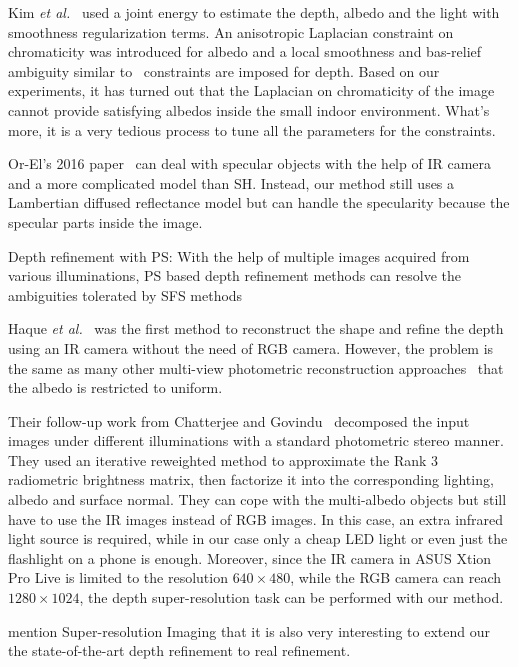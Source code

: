 Kim \emph{et al.}~\cite{kim2015joint} used a joint energy to estimate the depth, albedo and the light with smoothness regularization terms.
An anisotropic Laplacian constraint on chromaticity was introduced for albedo and a local smoothness and bas-relief ambiguity similar to~\cite{barron2013intrinsic} constraints are imposed for depth.
Based on our experiments, it has turned out that the Laplacian on chromaticity of the image cannot provide satisfying albedos inside the small indoor environment.
What's more, it is a very tedious process to tune all the parameters for the constraints.

Or-El's 2016 paper~\cite{or2016real} can deal with specular objects with the help of IR camera and a more complicated model than SH. 
Instead, our method still uses a Lambertian diffused reflectance model but can handle the specularity because the specular parts inside the image.


Depth refinement with PS: With the help of multiple images acquired from various illuminations, PS based depth refinement methods can resolve the ambiguities tolerated by SFS methods 

Haque \emph{et al.}~\cite{haque2014high} was the first method to reconstruct the shape and refine the depth using an IR camera without the need of RGB camera.
However, the problem is the same as many other multi-view photometric reconstruction approaches~\cite{park2013multiview, queau2017dense} that the albedo is restricted to uniform.

Their follow-up work from Chatterjee and Govindu~\cite{chatterjee2015photometric} decomposed the input images under different illuminations with a standard photometric stereo manner.
They used an iterative reweighted method to approximate the Rank 3 radiometric brightness matrix, then factorize it into the corresponding lighting, albedo and surface normal. 
They can cope with the multi-albedo objects but still have to use the IR images instead of RGB images. 
In this case, an extra infrared light source is required, while in our case only a cheap LED light or even just the flashlight on a phone is enough.
Moreover, since the IR camera in ASUS Xtion Pro Live is limited to the resolution $640\times 480$, while the RGB camera can reach $1280\times 1024$, the depth super-resolution task can be performed with our method.

mention Super-resolution Imaging that it is also very interesting to extend our the state-of-the-art depth refinement to real refinement.



